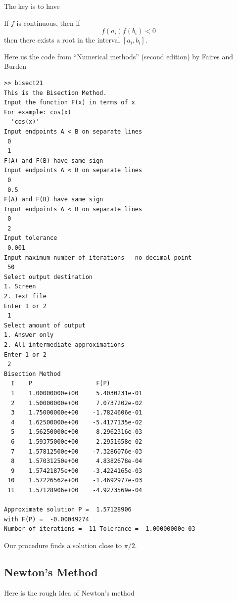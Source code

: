 The key is to have 
\begin{proposition}
    If $f$ is continuous, then if \[
        f(a_i)f(b_i) < 0
    \]  
    then there exists a root in the interval $[a_i, b_i]$.
\end{proposition}

Here us the code from ``Numerical
methods'' (second edition) by Faires and Burden

\begin{verbatim}
>> bisect21
This is the Bisection Method.
Input the function F(x) in terms of x
For example: cos(x)
  'cos(x)'
Input endpoints A < B on separate lines
 0
 1
F(A) and F(B) have same sign
Input endpoints A < B on separate lines
 0
 0.5
F(A) and F(B) have same sign
Input endpoints A < B on separate lines
 0
 2
Input tolerance
 0.001
Input maximum number of iterations - no decimal point
 50
Select output destination
1. Screen
2. Text file
Enter 1 or 2
 1
Select amount of output
1. Answer only
2. All intermediate approximations
Enter 1 or 2
 2
Bisection Method
  I    P                  F(P)
  1    1.00000000e+00     5.4030231e-01 
  2    1.50000000e+00     7.0737202e-02 
  3    1.75000000e+00    -1.7824606e-01 
  4    1.62500000e+00    -5.4177135e-02 
  5    1.56250000e+00     8.2962316e-03 
  6    1.59375000e+00    -2.2951658e-02 
  7    1.57812500e+00    -7.3286076e-03 
  8    1.57031250e+00     4.8382678e-04 
  9    1.57421875e+00    -3.4224165e-03 
 10    1.57226562e+00    -1.4692977e-03 
 11    1.57128906e+00    -4.9273569e-04 

Approximate solution P =  1.57128906 
with F(P) =  -0.00049274
Number of iterations =  11 Tolerance =  1.00000000e-03
\end{verbatim}

Our procedure finds a solution close to $\pi/2$.

\newpage

\subsection{Newton's Method}

Here is the rough idea of Newton's method

